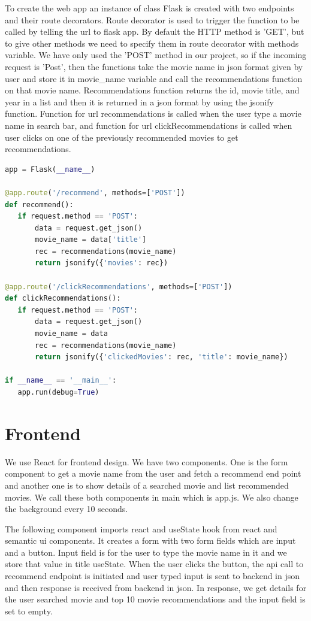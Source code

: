 To create the web app an instance of class Flask is created with two endpoints and their route decorators. Route decorator is used to trigger the function to be called by telling the url to flask app. By default the HTTP method is 'GET', but to give other methods we need to specify them in route decorator with methods variable. We have only used the 'POST' method in our project, so if the incoming request is 'Post', then the functions take the movie name in json format given by user and store it in movie\_name variable and call the recommendations function on that movie name. Recommendations function returns the id, movie title, and year in a list and then it is returned in a json format by using the jsonify function. Function for url recommendations is called when the user type a movie name in search bar, and function for url clickRecommendations is called when user clicks on one of the previously recommended movies to get recommendations. 

\begin{lstlisting}[language=python]
app = Flask(__name__)

@app.route('/recommend', methods=['POST'])
def recommend():
   if request.method == 'POST':
       data = request.get_json()
       movie_name = data['title']
       rec = recommendations(movie_name)
       return jsonify({'movies': rec})

@app.route('/clickRecommendations', methods=['POST'])
def clickRecommendations():
   if request.method == 'POST':
       data = request.get_json()
       movie_name = data
       rec = recommendations(movie_name)
       return jsonify({'clickedMovies': rec, 'title': movie_name})

if __name__ == '__main__':
   app.run(debug=True)
\end{lstlisting}


\section{Frontend}

We use React for frontend design. We have two components. One is the form component to get a movie name from the user and fetch a recommend end point and another one is to show details of a searched movie and list recommended movies. We call these both components in main which is app.js. We also change the background every 10 seconds.

The following component imports react and useState hook from react and semantic ui components. It creates a form with two form fields which are input and a button. Input field is for the user to type the movie name in it and we store that value in title useState.  When the user clicks the button, the api call to recommend endpoint is initiated and user typed input is sent to backend in json and then response is received from backend in json. In response, we get details for the user searched movie and top 10 movie recommendations and the input field is set to empty.

